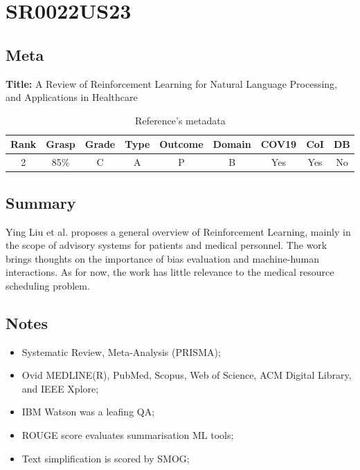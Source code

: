 \section{ SR0022US23 }


\subsection{Meta}

    \textbf{Title:}
    A Review of Reinforcement Learning for Natural Language Processing, and Applications in Healthcare

    \begin{table}[H]
        \centering
        \begin{tabular}{|c|c|c|c|c|c|c|c|c|}
            \hline
                \textbf{Rank} & \textbf{Grasp} & \textbf{Grade} & \textbf{Type} & \textbf{Outcome} & \textbf{Domain} & \textbf{COV19} & \textbf{CoI} & \textbf{DB} \\
            \hline
                2 & 85\% & C & A & P & B & Yes & Yes & No \\
            \hline
        \end{tabular}
        \caption{Reference's metadata}
        \label{tab:SR0022US23}
    \end{table}

\subsection{Summary}
    Ying Liu et al. \cite{x090} proposes a general overview of Reinforcement Learning, mainly in the scope of advisory systems for patients and medical personnel. The work brings thoughts on the importance of bias evaluation and machine-human interactions. As for now, the work has little relevance to the medical resource scheduling problem.

\subsection{Notes}
    \begin{itemize}
        \item Systematic Review, Meta-Analysis (PRISMA);
        \item Ovid MEDLINE(R), PubMed, Scopus, Web of Science, ACM Digital Library, and IEEE Xplore; 
        \item IBM Watson was a leafing QA;
        \item ROUGE score evaluates summarisation ML tools;
        \item Text simplification is scored by SMOG;
    \end{itemize}


